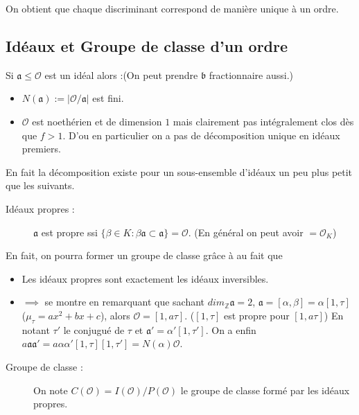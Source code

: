 \documentclass[12pt]{article}
\theoremstyle{plain}
\newcommand{\Z}{\mathbb{Z}}
\newcommand{\Or}{\mathcal{O}}
\newcommand{\OK}{\mathcal{O}_{K}}
\newcommand{\ai}{\mathfrak{a}}
\newcommand{\bi}{\mathfrak{b}}
\begin{document}
On obtient que chaque discriminant correspond de manière unique à un ordre.

\newpage

\subsection{Idéaux et Groupe de classe d'un ordre}
Si $\ai\leq \Or$ est un idéal alors :(On peut prendre $\bi$ fractionnaire aussi.)
 
\begin{itemize}
    \item $N(\ai):=\lvert \Or/\ai\rvert$ est fini.
    \item $\Or$ est noethérien et de dimension $1$ mais clairement pas intégralement clos dès que $f>1$. D'ou
    en particulier on a pas de décomposition unique en idéaux premiers.
\end{itemize}

En fait la décomposition existe pour un sous-ensemble d'idéaux un peu plus petit que les suivants.
\begin{description}
    \item[Idéaux propres :] $\ai$ est propre ssi $\{\beta\in K:\beta\ai\subset\ai\}=\Or$. (En général on peut avoir $=\OK$)
\end{description}

En fait, on pourra former un groupe de classe grâce à au fait que 
\begin{itemize}
    \item Les idéaux propres sont exactement les idéaux inversibles. 
    \item $\implies$ se montre en remarquant que sachant $dim_{\Z}\ai=2$, $\ai=[\alpha,\beta]=\alpha[1,\tau]$ ($\mu_{\tau}=ax^2+bx+c$), alors $\Or=[1, a\tau]$. ($[1, \tau]$ est propre pour $[1, a\tau]$)
    En notant $\tau'$ le conjugué de $\tau$ et $\ai'=\alpha'[1, \tau']$. On a enfin $a\ai\ai'=a\alpha\alpha'[1,\tau][1,\tau']=N(\alpha)\Or$.
\end{itemize}

\begin{description}
    \item[Groupe de classe :] On note $C(\Or)=I(\Or)/P(\Or)$ le groupe de classe formé par les idéaux propres.
\end{description}

\newpage
\end{document}
